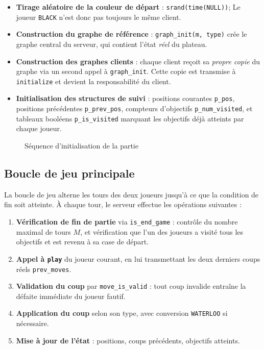 \documentclass[12pt,a4paper]{article}
\begin{document}
\begin{itemize}
    \item \textbf{Tirage aléatoire de la couleur de départ} : \texttt{srand(time(NULL))};
    Le joueur \texttt{BLACK}
    n'est donc pas toujours le même client.
    \item \textbf{Construction du graphe de référence} : \texttt{graph\_init(m, type)}
    crée le graphe central du serveur, qui contient l'état \textit{réel} du plateau.
    \item \textbf{Construction des graphes clients} : chaque client reçoit sa
    \textit{propre copie} du graphe via un second appel à \texttt{graph\_init}.
    Cette copie est transmise à \texttt{initialize} et devient la responsabilité
    du client.
    \item \textbf{Initialisation des structures de suivi} : positions courantes
    \texttt{p\_pos}, positions précédentes \texttt{p\_prev\_pos}, compteurs
    d'objectifs \texttt{p\_num\_visited}, et tableaux booléens \texttt{p\_is\_visited}
    marquant les objectifs déjà atteints par chaque joueur.
\end{itemize}

\begin{figure}[h]
\centering
\caption{Séquence d'initialisation de la partie}
\end{figure}

\subsection{Boucle de jeu principale}

La boucle de jeu alterne les tours des deux joueurs jusqu'à ce que la condition
de fin soit atteinte. À chaque tour, le serveur effectue les opérations suivantes :

\begin{enumerate}
    \item \textbf{Vérification de fin de partie} via \texttt{is\_end\_game} :
    contrôle du nombre maximal de tours $M$, et vérification que l'un des joueurs
    a visité tous les objectifs et est revenu à sa case de départ.
    \item \textbf{Appel à \texttt{play}} du joueur courant, en lui transmettant
    les deux derniers coups réels \texttt{prev\_moves}.
    \item \textbf{Validation du coup} par \texttt{move\_is\_valid} : tout coup
    invalide entraîne la défaite immédiate du joueur fautif.
    \item \textbf{Application du coup} selon son type, avec conversion
    \texttt{WATERLOO} si nécessaire.
    \item \textbf{Mise à jour de l'état} : positions, coups précédents, objectifs
    atteints.
\end{enumerate}
\end{document}
